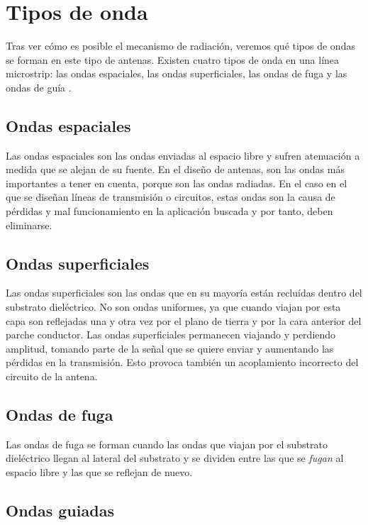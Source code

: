 \section{Tipos de onda}\label{sec:ondas}

Tras ver cómo es posible el mecanismo de radiación, veremos qué tipos de ondas se forman en este tipo de antenas. Existen cuatro tipos de onda en una línea microstrip: las ondas espaciales, las ondas superficiales, las ondas de fuga y las ondas de guía \cite{balanis2}\cite{bhartia}.

\subsection{Ondas espaciales}\label{subsec:ondas-espaciales}

Las ondas espaciales son las ondas enviadas al espacio libre y sufren atenuación a medida que se alejan de su fuente. En el diseño de antenas, son las ondas más importantes a tener en cuenta, porque son las ondas radiadas. En el caso en el que se diseñan líneas de transmisión o circuitos, estas ondas son la causa de pérdidas y mal funcionamiento en la aplicación buscada y por tanto, deben eliminarse.

\subsection{Ondas superficiales}\label{subsec:ondas-superficiales}

Las ondas superficiales son las ondas que en su mayoría están recluídas dentro del substrato dieléctrico. No son ondas uniformes, ya que cuando viajan por esta capa son reflejadas una y otra vez por el plano de tierra y por la cara anterior del parche conductor. Las ondas superficiales permanecen viajando y perdiendo amplitud, tomando parte de la señal que se quiere enviar y aumentando las pérdidas en la transmisión. Esto provoca también un acoplamiento incorrecto del circuito de la antena.

\subsection{Ondas de fuga}\label{subsec:ondas-de-fuga}

Las ondas de fuga se forman cuando las ondas que viajan por el substrato dieléctrico llegan al lateral del substrato y se dividen entre las que se \textit{fugan} al espacio libre y las que se reflejan de nuevo.

\subsection{Ondas guiadas}\label{subsec:ondas-guiadas}

